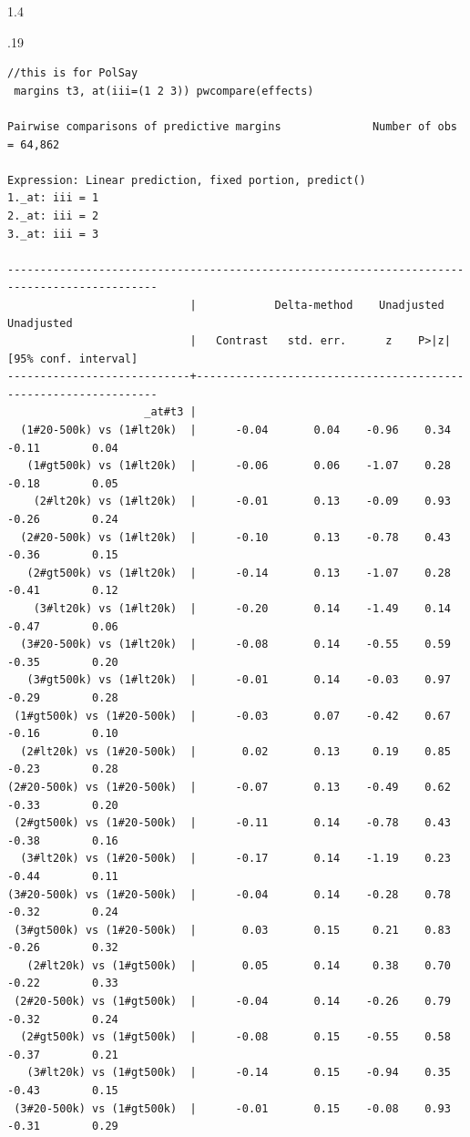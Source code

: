 \documentclass[10pt, letterpaper]{article}
\begin{document}
\begin{spacing}{1.4}
\begin{scriptsize}
\begin{spacing}{.19}
\begin{verbatim}
//this is for PolSay
 margins t3, at(iii=(1 2 3)) pwcompare(effects) 

Pairwise comparisons of predictive margins              Number of obs = 64,862

Expression: Linear prediction, fixed portion, predict()
1._at: iii = 1
2._at: iii = 2
3._at: iii = 3

---------------------------------------------------------------------------------------------
                            |            Delta-method    Unadjusted           Unadjusted
                            |   Contrast   std. err.      z    P>|z|     [95% conf. interval]
----------------------------+----------------------------------------------------------------
                     _at#t3 |
  (1#20-500k) vs (1#lt20k)  |      -0.04       0.04    -0.96    0.34        -0.11        0.04
   (1#gt500k) vs (1#lt20k)  |      -0.06       0.06    -1.07    0.28        -0.18        0.05
    (2#lt20k) vs (1#lt20k)  |      -0.01       0.13    -0.09    0.93        -0.26        0.24
  (2#20-500k) vs (1#lt20k)  |      -0.10       0.13    -0.78    0.43        -0.36        0.15
   (2#gt500k) vs (1#lt20k)  |      -0.14       0.13    -1.07    0.28        -0.41        0.12
    (3#lt20k) vs (1#lt20k)  |      -0.20       0.14    -1.49    0.14        -0.47        0.06
  (3#20-500k) vs (1#lt20k)  |      -0.08       0.14    -0.55    0.59        -0.35        0.20
   (3#gt500k) vs (1#lt20k)  |      -0.01       0.14    -0.03    0.97        -0.29        0.28
 (1#gt500k) vs (1#20-500k)  |      -0.03       0.07    -0.42    0.67        -0.16        0.10
  (2#lt20k) vs (1#20-500k)  |       0.02       0.13     0.19    0.85        -0.23        0.28
(2#20-500k) vs (1#20-500k)  |      -0.07       0.13    -0.49    0.62        -0.33        0.20
 (2#gt500k) vs (1#20-500k)  |      -0.11       0.14    -0.78    0.43        -0.38        0.16
  (3#lt20k) vs (1#20-500k)  |      -0.17       0.14    -1.19    0.23        -0.44        0.11
(3#20-500k) vs (1#20-500k)  |      -0.04       0.14    -0.28    0.78        -0.32        0.24
 (3#gt500k) vs (1#20-500k)  |       0.03       0.15     0.21    0.83        -0.26        0.32
   (2#lt20k) vs (1#gt500k)  |       0.05       0.14     0.38    0.70        -0.22        0.33
 (2#20-500k) vs (1#gt500k)  |      -0.04       0.14    -0.26    0.79        -0.32        0.24
  (2#gt500k) vs (1#gt500k)  |      -0.08       0.15    -0.55    0.58        -0.37        0.21
   (3#lt20k) vs (1#gt500k)  |      -0.14       0.15    -0.94    0.35        -0.43        0.15
 (3#20-500k) vs (1#gt500k)  |      -0.01       0.15    -0.08    0.93        -0.31        0.29

\end{verbatim}
\end{spacing}
\end{scriptsize}
\end{spacing}
\end{document}
